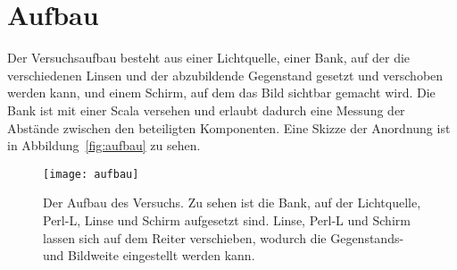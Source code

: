 
\section{Aufbau}

Der Versuchsaufbau besteht aus einer Lichtquelle, einer Bank, auf der
die verschiedenen Linsen und der abzubildende Gegenstand gesetzt und
verschoben werden kann, und einem Schirm, auf dem das Bild sichtbar
gemacht wird. Die Bank ist mit einer Scala versehen und erlaubt dadurch
eine Messung der Abstände zwischen den beteiligten Komponenten. Eine
Skizze der Anordnung ist in Abbildung~\vref{fig:aufbau} zu sehen.

\begin{figure}
  \centering
  \texttt{[image: aufbau]}
  \caption{Der Aufbau des Versuchs. Zu sehen ist die Bank, auf der
    Lichtquelle, Perl-L, Linse und Schirm aufgesetzt sind. Linse, Perl-L
    und Schirm lassen sich auf dem Reiter verschieben, wodurch die
    Gegenstands- und Bildweite eingestellt werden kann.}
  \label{fig:aufbau}
\end{figure}
